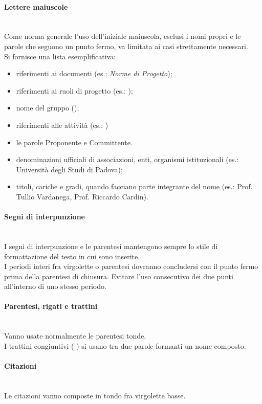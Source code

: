 \paragraph{Lettere maiuscole}\label{sec:lettere_maiuscole} \mbox{} \\
Come norma generale l'uso dell'iniziale maiuscola, esclusi i nomi propri e le parole che seguono un punto fermo, va limitata ai casi strettamente necessari.\\
Si fornisce una lista esemplificativa:
\begin{itemize}
	\item riferimenti ai documenti (es.: \textit{Norme di Progetto});
	\item riferimenti ai ruoli di progetto (es.: \Amministratore);
	\item nome del gruppo (\GroupName);
	\item riferimenti alle attività (es.: \VV) 
	\item le parole Proponente e Committente.
	\item denominazioni ufficiali di associazioni, enti, organismi istituzionali (es.: Università degli Studi di Padova);
	\item titoli, cariche e gradi, quando facciano parte integrante del nome (es.: Prof. Tullio Vardanega, Prof. Riccardo Cardin).
\end{itemize}

\paragraph{Segni di interpunzione} \mbox{} \\
I segni di interpunzione e le parentesi mantengono sempre lo stile di formattazione del testo in cui sono inserite.\\
I periodi interi fra virgolette o parentesi dovranno concludersi con il punto fermo prima della parentesi di chiusura.
Evitare l’uso consecutivo dei due punti all'interno di uno stesso periodo.

\paragraph{Parentesi, rigati e trattini} \mbox{} \\
Vanno usate normalmente le parentesi tonde.\\
I trattini congiuntivi (-) si usano tra due parole formanti un nome composto.

\paragraph{Citazioni} \mbox{} \\
Le citazioni vanno composte in tondo fra virgolette basse.


